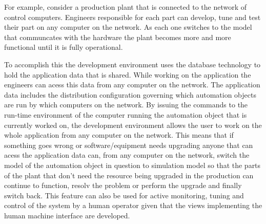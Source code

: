 For example, consider a production plant that is connected
to the network of control computers. Engineers responsible
for each part can develop, tune and test their part on any
computer on the network. As each one switches to the model
that communcates with the hardware the plant becomes more
and more functional until it is fully operational.

To accomplish this the development environment uses the
database technology to hold the application data that is
shared. While working on the application the engineers can
acess this data from any computer on the network. The
application data includes the distribution configuration
governing which automation objects are run by which
computers on the network. By issuing the commands to the
run-time environment of the computer running the automation
object that is currently worked on, the development
environment allows the user to work on the whole application
from any computer on the network. This means that if
something goes wrong or software/equipment needs upgrading
anyone that can acess the application data can, from any
computer on the network, switch the model of the automation
object in question to simulation model so that the parts of
the plant that don't need the resource being upgraded in the
production can continue to function, resolv the problem or
perform the upgrade and finally switch back. This feature
can also be used for active monitoring, tuning and control
of the system by a human operator given that the views
implementing the human machine interface are developed.
